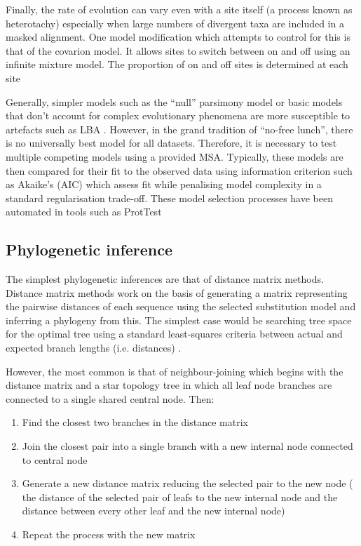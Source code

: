 Finally, the rate of evolution can vary even with a site itself (a process 
known as heterotachy) especially when large numbers of divergent taxa are included
in a masked alignment.  One model modification which attempts to control 
for this is that of the covarion model.  It allows sites to switch between
on and off using an infinite mixture model.  The proportion of on and off sites
is determined at each site \citep{Zhou2010} 



Generally, simpler models such as the ``null'' parsimony model or basic models
that don't account for complex evolutionary phenomena are more susceptible to
artefacts such as LBA \citep{Yang1996}.  However, in the grand tradition of
``no-free lunch'', there is no universally best model for all datasets.
Therefore, it is necessary to test multiple competing models using a provided
MSA.  Typically, these models are then compared for their fit to the observed
data using information criterion such as Akaike's (AIC) which assess
fit while penalising model complexity in a standard regularisation trade-off.
These model selection processes have been automated in tools such as ProtTest  
\citep{Abascal2005}


\subsection{Phylogenetic inference}

The simplest phylogenetic inferences are that of distance matrix methods.
Distance matrix methods \citep{Fitch1967} work on the basis of generating 
a matrix representing the pairwise distances of each sequence using the selected
substitution model and inferring a phylogeny from this.  The simplest case
would be searching tree space for the optimal tree using a standard least-squares
criteria between actual and expected branch lengths (i.e. distances) \citep{Fitch1967,Cavalli-Sforza1967}.

However, the most common is that of neighbour-joining which begins with the distance matrix and a 
star topology tree in which all leaf node branches are connected to a single shared central node.
Then:
\begin{enumerate}
    \item Find the closest two branches in the distance matrix 
    \item Join the closest pair into a single branch with a new internal node connected to central node
    \item Generate a new distance matrix reducing the selected pair to the new node (     
        the distance of the selected pair of leafs to the new internal node 
    and the distance between every other leaf and the new internal node)
    \item Repeat the process with the new matrix \citep{Nei1987}
\end{enumerate}

